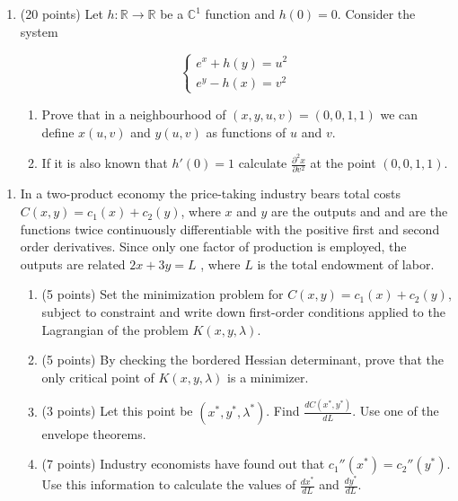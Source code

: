 
\begin{enumerate}[resume]
    \item (20 points) Let $h: \mathbb{R} \to \mathbb{R}$ be a $\mathbb{C}^1$ function and $h(0)=0$. Consider the system

$$
    \begin{cases}
      e^x+h(y)=u^2\\
      e^y-h(x)=v^2
    \end{cases}   
$$
            \begin{enumerate} 
                \item Prove that in a neighbourhood of $(x,y,u,v)=(0,0,1,1)$ we can define $x(u,v)$ and $y(u,v)$ as functions of $u$ and $v$.
                \item If it is also known that $h'(0)=1$ calculate $\frac{\partial ^2 x}{\partial v^2}$ at the point $(0,0,1,1)$.
            \end{enumerate}
\end{enumerate}

\begin{enumerate}[resume]
        \item  In a two-product economy the price-taking industry bears total costs $C(x,y)=c_1(x)+c_2(y)$, where $x$  and $y$  are the outputs and   and   are the functions twice continuously differentiable with the positive first and second order derivatives. Since only one factor of production is employed, the outputs are related $2x+3y=L$ , where $L$  is the total endowment of labor.
            \begin{enumerate}
                \item (5 points) Set the minimization problem for $C(x,y)=c_1(x)+c_2(y)$, subject to constraint and write down first-order conditions applied to the Lagrangian of the problem $K(x,y,\lambda)$.
	           \item (5 points) By checking the bordered Hessian determinant, prove that the only critical point of $K(x,y,\lambda)$ is a minimizer.
		        \item(3 points) Let this point be $(x^*,y^*,\lambda^*)$. Find $\frac{dC(x^*,y^*)}{dL}$. Use one of the envelope theorems.
		        \item(7 points) Industry economists have found out that $c_1''(x^*)=c_2''(y^*)$. Use this information to calculate the values of $\frac{dx^*}{dL}$ and $\frac{dy^*}{dL}$.
            \end{enumerate}
    \end{enumerate}


